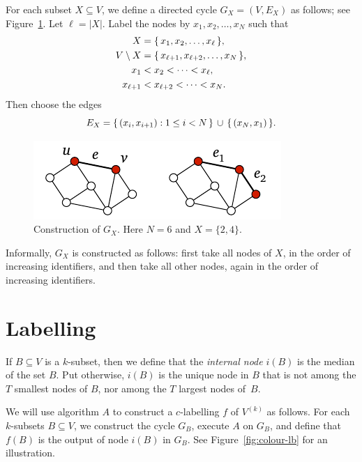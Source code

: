 For each subset $X \subseteq V$, we define a directed cycle $G_X = (V,E_X)$ as follows; see Figure~\ref{fig:subset-cycle}. Let $\ell = |X|$. Label the nodes by $x_1, x_2, \dotsc, x_N$ such that
\begin{align*}
    X &= \{\,  x_1, x_2, \dotsc, x_{\ell}  \,\}, \\
    V \setminus X &= \{\,  x_{\ell+1}, x_{\ell+2}, \dotsc, x_N  \,\}, \\
    x_1 &< x_2 < \dotsb < x_{\ell}, \\
    x_{\ell+1} &< x_{\ell+2} < \dotsb < x_N.
\end{align*}
Then choose the edges
\[
    E_X = \{\,  (x_i, x_{i+1}) : 1 \le i < N  \,\} \, \cup \, \{\,  (x_N,x_1)  \,\}.
\]

\begin{figure}
    \centering
    \includegraphics[page=\PSubsetCycle]{figs.pdf}
    \caption{Construction of $G_X$. Here $N = 6$ and $X = \{2,4\}$.}\label{fig:subset-cycle}
\end{figure}

Informally, $G_X$ is constructed as follows: first take all nodes of $X$, in the order of increasing identifiers, and then take all other nodes, again in the order of increasing identifiers.


\section{Labelling}

If $B \subseteq V$ is a $k$-subset, then we define that the \emph{internal node} $i(B)$ is the median of the set $B$. Put otherwise, $i(B)$ is the unique node in $B$ that is not among the $T$ smallest nodes of $B$, nor among the $T$ largest nodes of~$B$.

We will use algorithm $A$ to construct a $c$-labelling $f$ of $V^{(k)}$ as follows. For each $k$-subsets $B \subseteq V$, we construct the cycle $G_B$, execute $A$ on $G_B$, and define that $f(B)$ is the output of node $i(B)$ in $G_B$. See Figure~\ref{fig:colour-lb} for an illustration.

